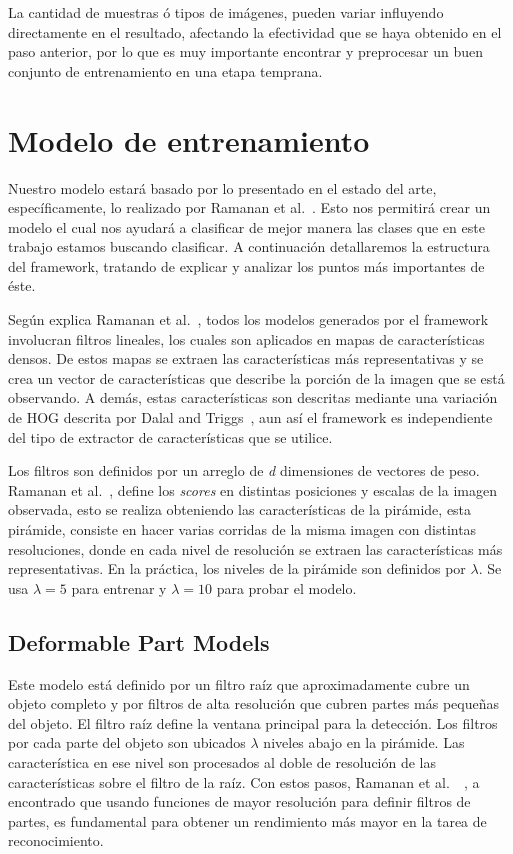 La cantidad de muestras ó tipos de imágenes, pueden variar influyendo directamente en el resultado, afectando la efectividad que se haya obtenido en el paso anterior, por lo que es muy importante encontrar y preprocesar un buen conjunto de entrenamiento en una etapa temprana.

\section{Modelo de entrenamiento}
\label{sec:model}
Nuestro modelo estará basado por lo presentado en el estado del arte, específicamente, lo realizado por Ramanan et al.~\cite{Felzenszwalb2010}. Esto nos permitirá crear un modelo el cual nos ayudará a clasificar de mejor manera las clases que en este trabajo estamos buscando clasificar. A continuación detallaremos la estructura del framework, tratando de explicar y analizar los puntos más importantes de éste.

Según explica Ramanan et al.~\cite{Felzenszwalb2010}, todos los modelos generados por el framework involucran filtros lineales, los cuales son aplicados en mapas de características densos. De estos mapas se extraen las características más representativas y se crea un vector de características que describe la porción de la imagen que se está observando. A demás, estas características son descritas mediante una variación de HOG descrita por Dalal and Triggs~\cite{Dalal2005}, aun así el framework es independiente del tipo de extractor de características que se utilice.

Los filtros son definidos por un arreglo de \textit{d} dimensiones de vectores de peso. Ramanan et al.~\cite{Felzenszwalb2010}, define los \textit{scores} en distintas posiciones y escalas de la imagen observada, esto se realiza obteniendo las características de la pirámide, esta pirámide, consiste en hacer varias corridas de la misma imagen con distintas resoluciones, donde en cada nivel de resolución se extraen las características más representativas. En la práctica, los niveles de la pirámide son definidos por $\lambda$. Se usa $\lambda = 5$ para entrenar y $\lambda = 10$ para probar el modelo.

\subsection{Deformable Part Models}
\label{subsec:dpm}
Este modelo está definido por un filtro raíz que aproximadamente cubre un objeto completo y por filtros de alta resolución que cubren partes más pequeñas del objeto. El filtro raíz define la ventana principal para la detección. Los filtros por cada parte del objeto son ubicados $\lambda$ niveles abajo en la pirámide. Las característica en ese nivel son procesados al doble de resolución de las características sobre el filtro de la raíz.
Con estos pasos, Ramanan et al.~\cite{Felzenszwalb2010}~\cite{Felzenszwalb2013}, a encontrado que usando funciones de mayor resolución para definir filtros de partes, es fundamental para obtener un rendimiento más mayor en la tarea de reconocimiento.

